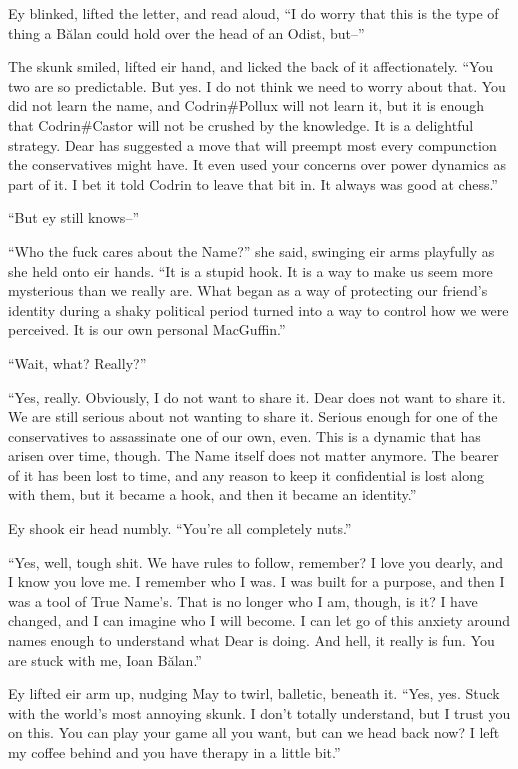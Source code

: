 Ey blinked, lifted the letter, and read aloud, ``I do worry that this is the type of thing a Bălan could hold over the head of an Odist, but--''

The skunk smiled, lifted eir hand, and licked the back of it affectionately. ``You two are so predictable. But yes. I do not think we need to worry about that. You did not learn the name, and Codrin\#Pollux will not learn it, but it is enough that Codrin\#Castor will not be crushed by the knowledge. It is a delightful strategy. Dear has suggested a move that will preempt most every compunction the conservatives might have. It even used your concerns over power dynamics as part of it. I bet it told Codrin to leave that bit in. It always was good at chess.''

``But ey still knows--''

``Who the fuck cares about the Name?'' she said, swinging eir arms playfully as she held onto eir hands. ``It is a stupid hook. It is a way to make us seem more mysterious than we really are. What began as a way of protecting our friend's identity during a shaky political period turned into a way to control how we were perceived. It is our own personal MacGuffin.''

``Wait, what? Really?''

``Yes, really. Obviously, I do not want to share it. Dear does not want to share it. We are still serious about not wanting to share it. Serious enough for one of the conservatives to assassinate one of our own, even. This is a dynamic that has arisen over time, though. The Name itself does not matter anymore. The bearer of it has been lost to time, and any reason to keep it confidential is lost along with them, but it became a hook, and then it became an identity.''

Ey shook eir head numbly. ``You're all completely nuts.''

``Yes, well, tough shit. We have rules to follow, remember? I love you dearly, and I know you love me. I remember who I was. I was built for a purpose, and then I was a tool of True Name's. That is no longer who I am, though, is it? I have changed, and I can imagine who I will become. I can let go of this anxiety around names enough to understand what Dear is doing. And hell, it really is fun. You are stuck with me, Ioan Bălan.''

Ey lifted eir arm up, nudging May to twirl, balletic, beneath it. ``Yes, yes. Stuck with the world's most annoying skunk. I don't totally understand, but I trust you on this. You can play your game all you want, but can we head back now? I left my coffee behind and you have therapy in a little bit.''
